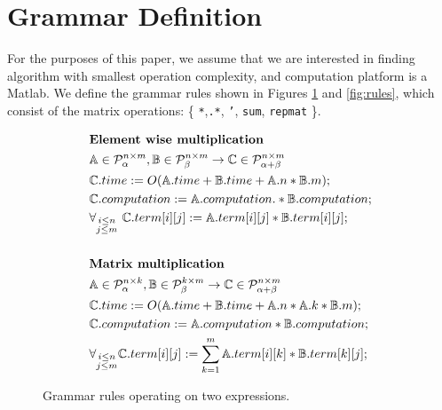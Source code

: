 
\section{Grammar Definition}\label{sec:grammars}
For the purposes of this paper, we assume that we are interested in
finding algorithm with smallest operation complexity, and computation platform
is a Matlab. We define the grammar rules shown in Figures
\ref{fig:rules2} and \ref{fig:rules}, which consist of the 
matrix operations: \{ \texttt{*},\texttt{.*}, \texttt{'},
\texttt{sum}, \texttt{repmat} \}.


\begin{figure}
\begin{framed}
\begin{align*}
&\text{{\bf Element wise multiplication}}\\
&\mathbb{A} \in \mathcal{P}^{n \times m}_\alpha, \mathbb{B} \in \mathcal{P}^{n \times m}_\beta \rightarrow \mathbb{C} \in \mathcal{P}^{n \times m}_{\alpha + \beta} \\
&\mathbb{C}.time := O(\mathbb{A}.time + \mathbb{B}.time + \mathbb{A}.n * \mathbb{B}.m);\\
&\mathbb{C}.computation := \mathbb{A}.computation .* \mathbb{B}.computation;\\
&\forall_{\substack{i \leq n\\j \leq m}}\text{ }\mathbb{C}.term[i][j] := \mathbb{A}.term[i][j] * \mathbb{B}.term[i][j];\\
& \\
&\text{{\bf Matrix multiplication}}\\
&\mathbb{A} \in \mathcal{P}^{n \times k}_\alpha, \mathbb{B} \in \mathcal{P}^{k \times m}_\beta \rightarrow \mathbb{C} \in \mathcal{P}^{n \times m}_{\alpha + \beta} \\
&\mathbb{C}.time := O(\mathbb{A}.time + \mathbb{B}.time + \mathbb{A}.n * \mathbb{A}.k * \mathbb{B}.m);\\
&\mathbb{C}.computation := \mathbb{A}.computation * \mathbb{B}.computation;\\
&\forall_{\substack{i \leq n\\j \leq m}}\mathbb{C}.term[i][j] := \sum_{k = 1}^m \mathbb{A}.term[i][k] * \mathbb{B}.term[k][j];
\end{align*}
\caption{Grammar rules operating on two expressions.}
\label{fig:rules2}
\end{framed}
\end{figure}

